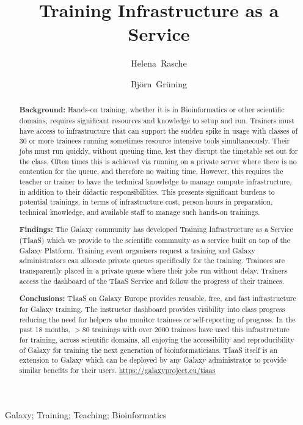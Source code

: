 \documentclass[a4paper,num-refs]{oup-contemporary}
\title{Training Infrastructure as a Service}
\author[1,\authfn{1},\authfn{2}]{Helena~Rasche}
\author[2,\authfn{2}]{Bj\"orn~Gr\"uning}
\affil[1]{Bioinformatics Group, Department of Computer Science, University of Freiburg, 79110 Freiburg im Breisgau, Germany}
\begin{document}
\begin{frontmatter}
\maketitle
\begin{abstract}
\textbf{Background:} Hands-on training, whether it is in Bioinformatics or other scientific domains, requires significant resources and knowledge to setup and run.
Trainers must have access to infrastructure that can support the sudden spike in usage with classes of 30 or more trainees running sometimes resource intensive tools simultaneously.
Their jobs must run quickly, without queuing time, lest they disrupt the timetable set out for the class. Often times this is achieved via running on a private server where there is no contention for the queue, and therefore no waiting time. However, this requires the teacher or trainer to have the technical knowledge to manage compute infrastructure, in addition to their didactic responsibilities. This presents significant burdens to potential trainings, in terms of infrastructure cost, person-hours in preparation, technical knowledge, and available staff to manage such hands-on trainings.

\textbf{Findings:} The Galaxy community has developed Training Infrastructure as a Service (TIaaS) which we provide to the scientific commnuity as a service built on top of the Galaxy Platform. Training event organisers request a training and Galaxy administrators can allocate private queues specifically for the training. Trainees are transparently placed in a private queue where their jobs run without delay. Trainers access the dashboard of the TIaaS Service and follow the progress of their trainees.

\textbf{Conclusions:} TIaaS on Galaxy Europe provides reusable, free, and fast infrastructure for Galaxy training. The instructor dashboard provides visibility into class progress reducing the need for helpers who monitor trainees or self-reporting of progress. In the past 18 months, $>80$ trainings with over 2000 trainees have used this infrastructure for training, across scientific domains, all enjoying the accessibility and reproducibility of Galaxy for training the next generation of bioinformaticians. TIaaS itself is an extension to Galaxy which can be deployed by any Galaxy administrator to provide similar benefits for their users. \url{https://galaxyproject.eu/tiaas}
\end{abstract}

\begin{keywords}
Galaxy; Training; Teaching; Bioinformatics
\end{keywords}
\end{frontmatter}
\end{document}

